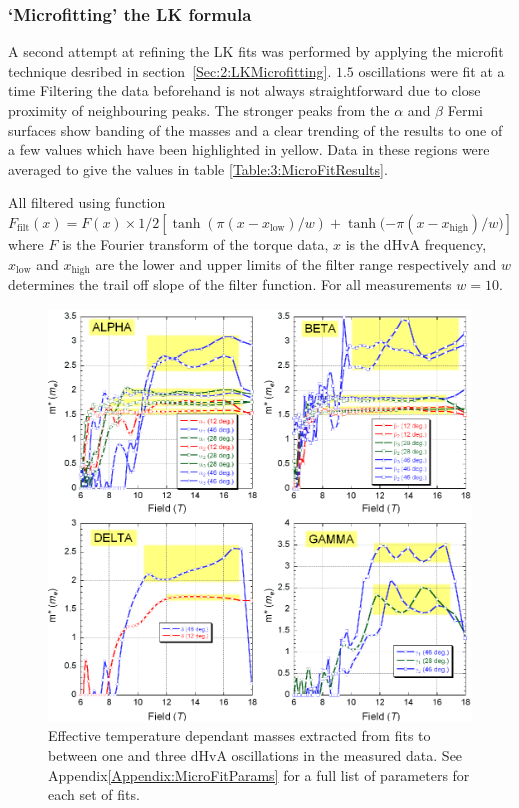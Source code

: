 \subsubsection{`Microfitting' the LK formula}

A second attempt at refining the LK fits was performed by applying the microfit technique desribed in section~\ref{Sec:2:LKMicrofitting}. $1.5$ oscillations were fit at a time Filtering the data beforehand is not always straightforward due to close proximity of neighbouring peaks. The stronger peaks from the $\alpha$ and $\beta$ Fermi surfaces show banding of the masses and a clear trending of the results to one of a few values which have been highlighted in yellow. Data in these regions were averaged to give the values in table \ref{Table:3:MicroFitResults}.

All filtered using function $\textit{F}_{\textrm{filt}}(x) = \textit{F}(x) \times 1/2 [\tanh{(\pi(x - x_{\textrm{low}})/w)} + \tanh{(-\pi(x - x_{\textrm{high}})/w})]$ where $\textit{F}$ is the Fourier transform of the torque data, $x$ is the dHvA frequency, $x_{\textrm{low}}$ and $x_{\textrm{high}}$ are the lower and upper limits of the filter range respectively and $w$ determines the trail off slope of the filter function. For all measurements $w=10$.
\begin{figure}[h!]
    \begin{center}
        \includegraphics[scale=0.7]{Chapter3-dHvABaFe2P2/Figures/Mass/MicroFits/MicroFits}
        \caption{Effective temperature dependant masses extracted from fits to between one and three dHvA oscillations in the measured data. See Appendix\ref{Appendix:MicroFitParams} for a full list of parameters for each set of fits.}
        \label{Fig:3:MicroFits}
    \end{center}
\end{figure}
